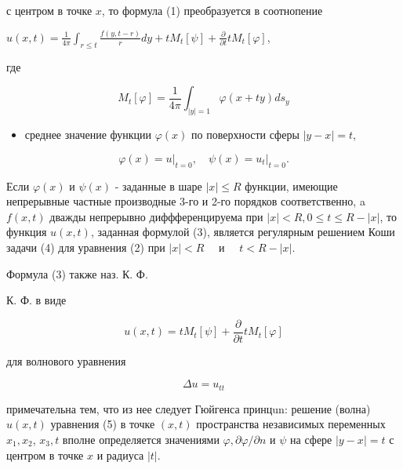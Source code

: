 \documentclass[10pt]{article}
\begin{document}
с центром в точке $x$, то формула (1) преобразуется в соотнопение



$u(x, t)=\frac{1}{4 \pi} \int_{r \leqslant t} \frac{f(y, t-r)}{r} d y+t M_{t}[\psi]+\frac{\partial}{\partial t} t M_{t}[\varphi]$,



где



\[

M_{t}[\varphi]=\frac{1}{4 \pi} \int_{|y|=1} \varphi(x+t y) d s_{y}

\]



\begin{itemize}

  \item среднее значение функции $\varphi(x)$ по поверхности сферы $|y-x|=t$,

\end{itemize}



\[

\varphi(x)=\left.u\right|_{t=0}, \quad \psi(x)=\left.u_{t}\right|_{t=0} .

\]



Если $\varphi(x)$ и $\psi(x)$ - заданные в шаре $|x| \leqslant R$ функции, имеющие непрерывные частные производные 3-го и 2-го порядков соответственно, a $f(x, t)$ дважды непрерывно диффференцируема при $|x|<R, 0 \leqslant t \leqslant R-|x|$, то функция $u(x, t)$, заданная формулой (3), является регулярным решением Коши задачи (4) для уравнения (2) при $|x|<R \quad$ и $\quad t<R-|x|$.



Формула (3) также наз. К. Ф.



К. Ф. в виде



\[

u(x, t)=t M_{t}[\psi]+\frac{\partial}{\partial t} t M_{t}[\varphi]

\]



для волнового уравнения



\[

\Delta u=u_{t t}

\]



примечательна тем, что из нее следует Гюйгенса принцun: решение (волна) $u(x, t)$ уравнения (5) в точке $(x, t)$ пространства независимых переменных $x_{1}, x_{2}$, $x_{3}, t$ вполне определяется значениями $\varphi, \partial \varphi / \partial n$ и $\psi$ на сфере $|y-x|=t$ с центром в точке $x$ и радиуса $|t|$.
\end{document}

